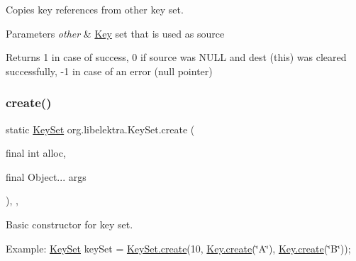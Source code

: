 Copies key references from other key set. 


\begin{DoxyParams}{Parameters}
{\em other} & \hyperlink{classorg_1_1libelektra_1_1Key}{Key} set that is used as source \\
\hline
\end{DoxyParams}
\begin{DoxyReturn}{Returns}
1 in case of success, 0 if source was N\+U\+LL and dest (this) was cleared successfully, -\/1 in case of an error (null pointer) 
\end{DoxyReturn}
\mbox{\label{classorg_1_1libelektra_1_1KeySet_ae3f1cd9ac1a4fd2ef7d16e6c320bc6a3}} 
\subsubsection{\texorpdfstring{create()}{create()}\hspace{0.1cm}{\footnotesize\ttfamily [1/3]}}
{\footnotesize\ttfamily static \hyperlink{classorg_1_1libelektra_1_1KeySet}{Key\+Set} org.\+libelektra.\+Key\+Set.\+create (\begin{DoxyParamCaption}\item[{final int}]{alloc,  }\item[{final Object...}]{args }\end{DoxyParamCaption})\hspace{0.3cm}{\ttfamily [inline]}, {\ttfamily [static]}, {\ttfamily [protected]}}



Basic constructor for key set. 

Example\+: \hyperlink{classorg_1_1libelektra_1_1KeySet}{Key\+Set} key\+Set = \hyperlink{classorg_1_1libelektra_1_1KeySet_ae3f1cd9ac1a4fd2ef7d16e6c320bc6a3}{Key\+Set.\+create}(10, \hyperlink{classorg_1_1libelektra_1_1Key_af407cf43625618af4e7fb2576037fcfc}{Key.\+create}(\char`\"{}\+A\char`\"{}), \hyperlink{classorg_1_1libelektra_1_1Key_af407cf43625618af4e7fb2576037fcfc}{Key.\+create}(\char`\"{}\+B\char`\"{}));


